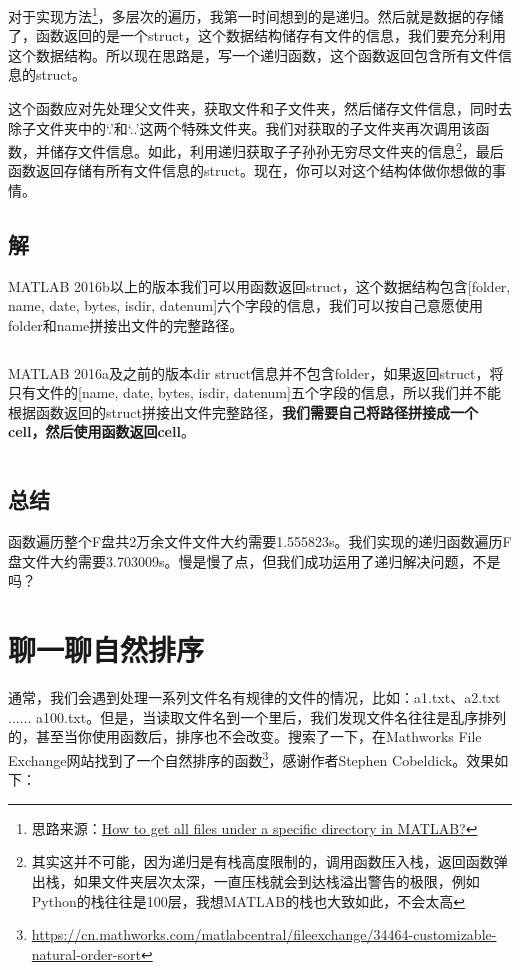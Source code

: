 对于实现方法\footnote{思路来源：\href{https://stackoverflow.com/questions/2652630/how-to-get-all-files-under-a-specific-directory-in-matlab}{How to get all files under a specific directory in MATLAB?}}，多层次的遍历，我第一时间想到的是递归。然后就是数据的存储了，函数返回的是一个struct，这个数据结构储存有文件的信息，我们要充分利用这个数据结构。所以现在思路是，写一个递归函数，这个函数返回包含所有文件信息的struct。

这个函数应对先处理父文件夹，获取文件和子文件夹，然后储存文件信息，同时去除子文件夹中的`.'和`..'这两个特殊文件夹。我们对获取的子文件夹再次调用该函数，并储存文件信息。如此，利用递归获取子子孙孙无穷尽文件夹的信息\footnote{其实这并不可能，因为递归是有栈高度限制的，调用函数压入栈，返回函数弹出栈，如果文件夹层次太深，一直压栈就会到达栈溢出警告的极限，例如Python的栈往往是100层，我想MATLAB的栈也大致如此，不会太高}，最后函数返回存储有所有文件信息的struct。现在，你可以对这个结构体做你想做的事情。

\subsection*{解}

MATLAB 2016b以上的版本我们可以用函数返回struct，这个数据结构包含[folder, name, date, bytes, isdir, datenum]六个字段的信息，我们可以按自己意愿使用folder和name拼接出文件的完整路径。

\inputminted[firstline=1]{Matlab}{code/matlab/get_all_file_name_R2016b_newer.m}

MATLAB 2016a及之前的版本dir struct信息并不包含folder，如果返回struct，将只有文件的[name, date, bytes, isdir, datenum]五个字段的信息，所以我们并不能根据函数返回的struct拼接出文件完整路径，\textbf{我们需要自己将路径拼接成一个cell，然后使用函数返回cell}。

\inputminted{Matlab}{code/matlab/get_all_file_name_R2016a_older.m}

\subsection*{总结}
函数遍历整个F盘共2万余文件文件大约需要1.555823s。我们实现的递归函数遍历F盘文件大约需要3.703009s。慢是慢了点，但我们成功运用了递归解决问题，不是吗？

\section{聊一聊自然排序}

通常，我们会遇到处理一系列文件名有规律的文件的情况，比如：a1.txt、a2.txt ...... a100.txt。但是，当读取文件名到一个里后，我们发现文件名往往是乱序排列的，甚至当你使用函数后，排序也不会改变。搜索了一下，在Mathworks File Exchange网站找到了一个自然排序的函数\footnote{\url{https://cn.mathworks.com/matlabcentral/fileexchange/34464-customizable-natural-order-sort}}，感谢作者Stephen Cobeldick。效果如下：

